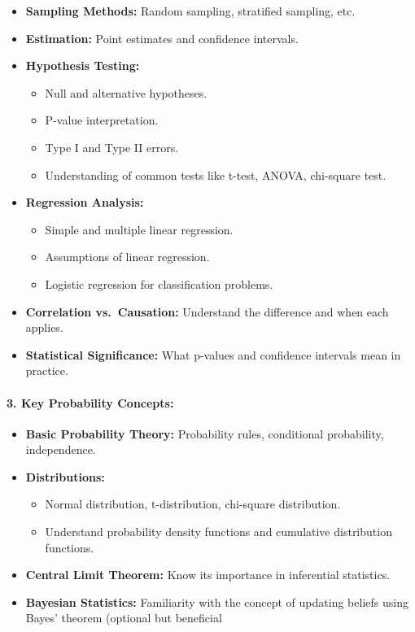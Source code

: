 \documentclass[12pt]{book}
\providecommand{\tightlist}{%
  \setlength{\itemsep}{0pt}\setlength{\parskip}{0pt}}
\begin{document}
\begin{itemize}
\tightlist
\item
  \textbf{Sampling Methods:} Random sampling, stratified sampling, etc.
\item
  \textbf{Estimation:} Point estimates and confidence intervals.
\item
  \textbf{Hypothesis Testing:}

  \begin{itemize}
  \tightlist
  \item
    Null and alternative hypotheses.
  \item
    P-value interpretation.
  \item
    Type I and Type II errors.
  \item
    Understanding of common tests like t-test, ANOVA, chi-square test.
  \end{itemize}
\item
  \textbf{Regression Analysis:}

  \begin{itemize}
  \tightlist
  \item
    Simple and multiple linear regression.
  \item
    Assumptions of linear regression.
  \item
    Logistic regression for classification problems.
  \end{itemize}
\item
  \textbf{Correlation vs.~Causation:} Understand the difference and when
  each applies.
\item
  \textbf{Statistical Significance:} What p-values and confidence
  intervals mean in practice.
\end{itemize}

\paragraph{\texorpdfstring{\textbf{3. Key Probability
Concepts:}}{3. Key Probability Concepts:}}\label{key-probability-concepts}

\begin{itemize}
\tightlist
\item
  \textbf{Basic Probability Theory:} Probability rules, conditional
  probability, independence.
\item
  \textbf{Distributions:}

  \begin{itemize}
  \tightlist
  \item
    Normal distribution, t-distribution, chi-square distribution.
  \item
    Understand probability density functions and cumulative distribution
    functions.
  \end{itemize}
\item
  \textbf{Central Limit Theorem:} Know its importance in inferential
  statistics.
\item
  \textbf{Bayesian Statistics:} Familiarity with the concept of updating
  beliefs using Bayes' theorem (optional but beneficial
\end{itemize}
\end{document}
